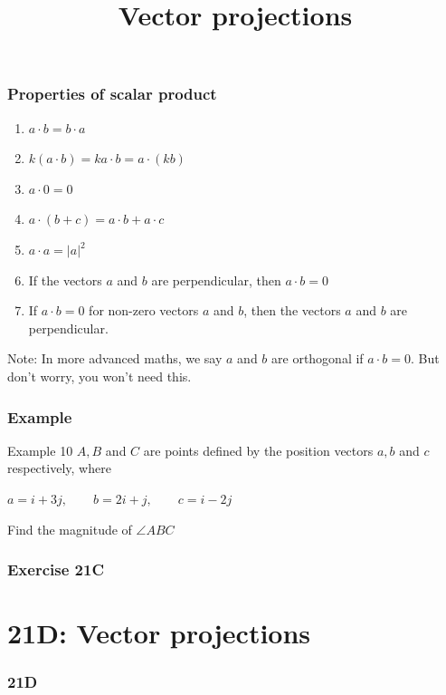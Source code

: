 \documentclass[
	11pt, %
]{beamer}
\newcommand{\blank}{\begin{frame}\end{frame}}
\begin{document}
\begin{frame}
    \frametitle{Properties of scalar product}
    \begin{enumerate}
        \item $a\cdot b = b\cdot a$
        \item $k(a\cdot b) = ka\cdot b = a\cdot(kb)$
        \item $a\cdot 0 = 0$
        \item $a\cdot(b+c) = a\cdot b + a\cdot c$
        \item $a\cdot a = |a|^2$
        \item If the vectors $a$ and $b$ are perpendicular, then $a\cdot b = 0$
        \item If $a\cdot b = 0$ for non-zero vectors $a$ and $b$, then the vectors $a$ and $b$ are perpendicular.
    \end{enumerate}
    Note: In more advanced maths, we say $a$ and $b$ are orthogonal if $a\cdot b = 0$. But don't worry, you won't need this.
\end{frame}

\begin{frame}[t]
    \frametitle{Example}
    \begin{block}{Example 10}
        $A, B$ and $C$ are points defined by the position vectors $a,b$ and $c$ respectively, where\\
        \begin{center}
            $a = i + 3j, \qquad b = 2i + j, \qquad c = i - 2j$
        \end{center}       
        Find the magnitude of $\angle ABC$
    \end{block}
\end{frame}

\blank

\begin{frame}
    \frametitle{Exercise 21C}
\end{frame}


\section{21D: Vector projections}
\begin{frame}
    \frametitle{21D}
    \begin{center}
        \title{Vector projections}
        \maketitle
    \end{center}
\end{frame}
\end{document}
